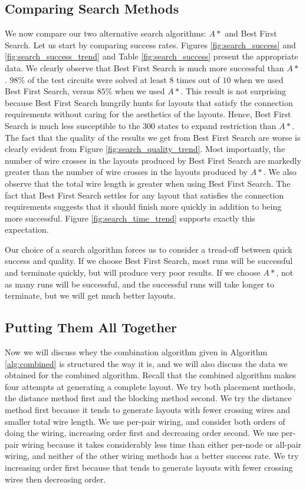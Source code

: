 \subsection{Comparing Search Methods}

We now compare our two alternative search algorithms: $A*$ and Best First Search.
Let us start by comparing success rates. Figures \ref{fig:search_success} and
\ref{fig:search_success_trend} and Table \ref{fig:search_success} present the
appropriate data. We clearly observe that Best First Search is much more
successful than $A*$. $98\%$ of the test circuits were solved at least $8$ times
out of $10$ when we used Best First Search, versus $85\%$ when we used $A*$.
This result is not surprising because Best First Search hungrily hunts for
layouts that satisfy the connection requirements without caring for the
aesthetics of the layouts. Hence, Best First Search is much less susceptible to
the $300$ states to expand restriction than $A*$. The fact that the quality of
the results we get from Best First Search are worse
is clearly evident from Figure \ref{fig:search_quality_trend}. Most importantly, the
number of wire crosses in the layouts produced by Best First Search are markedly
greater than the number of wire crosses in the layouts produced by $A*$. We also
observe that the total wire length is greater when using Best First Search. The
fact that Best First Search settles for any layout that satisfies the connection
requirements suggests that it should finish more quickly in addition to being
more successful. Figure \ref{fig:search_time_trend} supports exactly this
expectation.

Our choice of a search algorithm forces us to consider a tread-off between quick
success and quality. If we choose Best First Search, most runs will be successful
and terminate quickly, but will produce very poor results. If we choose $A*$,
not as many runs will be successful, and the successful runs will take longer to
terminate, but we will get much better layouts.

\subsection{Putting Them All Together}
\label{sec:method_combination}

Now we will discuss whey the combination algorithm given in Algorithm
\ref{alg:combined} is structured the way it is, and we will also
discuss the data we obtained for the combined algorithm. Recall that the combined
algorithm makes four attempts at generating a complete layout. We try both
placement methods, the distance method first and the blocking method second. We
try the distance method first because it tends to generate layouts with fewer
crossing wires and smaller total wire length. We use per-pair wiring, and
consider both orders of doing the wiring, increasing order first and decreasing
order second. We use per-pair wiring because it takes considerably
less time than either per-node or all-pair wiring, and neither of the other
wiring methods has a better success rate. We try increasing order first because
that tends to generate layouts with fewer crossing wires then decreasing order.

